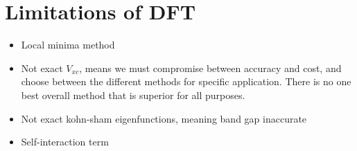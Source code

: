 \section{Limitations of DFT}
\begin{itemize}
    \item Local minima method
    \item Not exact $V_{xc}$, means we must compromise between accuracy and cost, and choose between the different methods for specific application. There is no one best overall method that is superior for all purposes. 
    \item Not exact kohn-sham eigenfunctions, meaning band gap inaccurate
    \item Self-interaction term 
\end{itemize}

